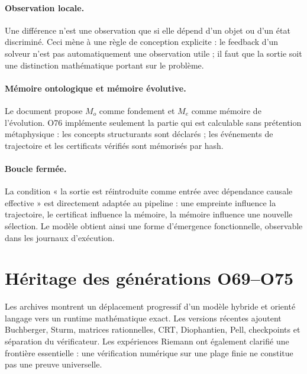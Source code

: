 \documentclass[11pt,a4paper]{article}
\begin{document}
\paragraph{Observation locale.} Une différence n'est une observation que si elle dépend d'un objet ou d'un état discriminé. Ceci mène à une règle de conception explicite : le feedback d'un solveur n'est pas automatiquement une observation utile ; il faut que la sortie soit une distinction mathématique portant sur le problème.

\paragraph{Mémoire ontologique et mémoire évolutive.} Le document propose $M_o$ comme fondement et $M_e$ comme mémoire de l'évolution. O76 implémente seulement la partie qui est calculable sans prétention métaphysique : les concepts structurants sont déclarés ; les événements de trajectoire et les certificats vérifiés sont mémorisés par hash.

\paragraph{Boucle fermée.} La condition « la sortie est réintroduite comme entrée avec dépendance causale effective » est directement adaptée au pipeline : une empreinte influence la trajectoire, le certificat influence la mémoire, la mémoire influence une nouvelle sélection. Le modèle obtient ainsi une forme d'émergence fonctionnelle, observable dans les journaux d'exécution.

\section{Héritage des générations O69--O75}
Les archives montrent un déplacement progressif d'un modèle hybride et orienté langage vers un runtime mathématique exact. Les versions récentes ajoutent Buchberger, Sturm, matrices rationnelles, CRT, Diophantien, Pell, checkpoints et séparation du vérificateur. Les expériences Riemann ont également clarifié une frontière essentielle : une vérification numérique sur une plage finie ne constitue pas une preuve universelle.
\end{document}
